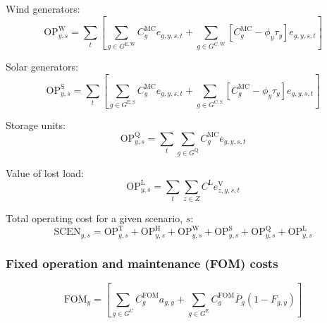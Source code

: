 \documentclass{article}
\newcommand{\sGeneratorsExisting}{G^{\mathrm{E}}}
\newcommand{\sGeneratorsExistingWind}{G^{\mathrm{E,W}}}
\newcommand{\sGeneratorsExistingSolar}{G^{\mathrm{E,S}}}
\newcommand{\sGeneratorsCandidate}{G^{\mathrm{C}}}
\newcommand{\sGeneratorsCandidateWind}{G^{\mathrm{C,W}}}
\newcommand{\sGeneratorsCandidateSolar}{G^{\mathrm{C,S}}}
\newcommand{\sStorage}{G^{\mathrm{Q}}}
\newcommand{\sZones}{Z}
\newcommand{\iGenerator}{g}
\newcommand{\iYear}{y}
\newcommand{\iScenario}{s}
\newcommand{\iInterval}{t}
\newcommand{\iZone}{z}
\newcommand{\cOperatingCostThermal}[1][\iYear,\iScenario]{\mathrm{OP}^{\mathrm{T}}_{#1}}
\newcommand{\cOperatingCostHydro}[1][\iYear,\iScenario]{\mathrm{OP}^{\mathrm{H}}_{#1}}
\newcommand{\cOperatingCostWind}[1][\iYear,\iScenario]{\mathrm{OP}^{\mathrm{W}}_{#1}}
\newcommand{\cOperatingCostSolar}[1][\iYear,\iScenario]{\mathrm{OP}^{\mathrm{S}}_{#1}}
\newcommand{\cOperatingCostStorage}[1][\iYear,\iScenario]{\mathrm{OP}^{\mathrm{Q}}_{#1}}
\newcommand{\cFixedOperationsMaintenanceCost}[1][\iYear]{\mathrm{FOM}_{#1}}
\newcommand{\cFixedOperationsMaintenanceCostGenerator}[1][\iGenerator]{C^{\mathrm{FOM}}_{#1}}
\newcommand{\cMarginalCost}[1][\iGenerator,\iYear]{C^{\mathrm{MC}}_{#1}}
\newcommand{\cPowerOutputMax}[1][\iGenerator,\iYear]{\overline{P}_{#1}}
\newcommand{\cOperatingCostLostLoad}[1][\iYear,\iScenario]{\mathrm{OP}^{\mathrm{L}}_{#1}}
\newcommand{\cLostLoadCost}{C^{\mathrm{L}}}
\newcommand{\cOperatingCostScenario}[1][\iYear,\iScenario]{\mathrm{SCEN}_{#1}}
\newcommand{\cRetirementIndicator}[1][\iGenerator,\iYear]{F_{#1}}
\newcommand{\vBaseline}[1][\iYear]{\phi_{#1}}
\newcommand{\vPermitPrice}[1][\iYear]{\tau_{#1}}
\newcommand{\vEnergy}[1][\iGenerator,\iYear,\iScenario,\iInterval]{e_{#1}}
\newcommand{\vLostLoadEnergy}[1][\iZone,\iYear,\iScenario,\iInterval]{e^{\mathrm{V}}_{#1}}
\newcommand{\vInstalledCapacityTotal}[1][\iGenerator,\iYear]{a_{#1}}
\begin{document}
Wind generators:
\begin{equation}
	\cOperatingCostWind = \sum\limits_{\iInterval}\left[\sum\limits_{\iGenerator \in \sGeneratorsExistingWind} \cMarginalCost[\iGenerator] \vEnergy + \sum\limits_{\iGenerator \in \sGeneratorsCandidateWind} \left[\cMarginalCost[\iGenerator] - \vBaseline \vPermitPrice\right] \vEnergy\right]
\end{equation}

Solar generators:
\begin{equation}
	\cOperatingCostSolar = \sum\limits_{\iInterval}\left[\sum\limits_{\iGenerator \in \sGeneratorsExistingSolar} \cMarginalCost[\iGenerator] \vEnergy + \sum\limits_{\iGenerator \in \sGeneratorsCandidateSolar} \left[\cMarginalCost[\iGenerator] - \vBaseline\vPermitPrice\right] \vEnergy\right]
\end{equation}

Storage units:
\begin{equation}
	\cOperatingCostStorage = \sum\limits_{\iInterval}\sum\limits_{\iGenerator \in \sStorage} \cMarginalCost[\iGenerator] \vEnergy
\end{equation}

Value of lost load:
\begin{equation}
	\cOperatingCostLostLoad = \sum\limits_{\iInterval}\sum\limits_{\iZone \in \sZones} \cLostLoadCost \vLostLoadEnergy
\end{equation}

Total operating cost for a given scenario, $\iScenario$:
\begin{equation}
	\cOperatingCostScenario = \cOperatingCostThermal + \cOperatingCostHydro + \cOperatingCostWind + \cOperatingCostSolar + \cOperatingCostStorage + \cOperatingCostLostLoad
\end{equation}

\subsubsection{Fixed operation and maintenance (FOM) costs}

\begin{equation}
	\cFixedOperationsMaintenanceCost = \left[\sum\limits_{\iGenerator \in \sGeneratorsCandidate} \cFixedOperationsMaintenanceCostGenerator \vInstalledCapacityTotal + \sum\limits_{\iGenerator \in \sGeneratorsExisting} \cFixedOperationsMaintenanceCostGenerator \cPowerOutputMax[\iGenerator] \left(1 - \cRetirementIndicator\right) \right]
\end{equation}
\end{document}
